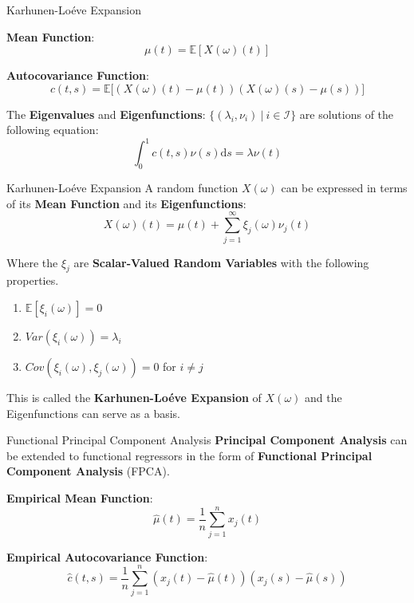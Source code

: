 \documentclass{beamer}
\begin{document}
	\begin{frame}{Karhunen-Lo\'{e}ve Expansion}
		
		\textbf{Mean Function}: $$\mu(t) = \mathbb{E}\left[ X(\omega)(t) \right]$$

		\textbf{Autocovariance Function}: $$c(t,s) = \mathbb{E}\big[ \left( X(\omega)(t) - \mu(t) \right) \left( X(\omega)(s) - \mu(s) \right) \big]$$
		
		The \textbf{Eigenvalues} and \textbf{Eigenfunctions}: $\{(\lambda_i, \nu_i) \: \vert \: i \in \mathcal{I}\}$  are solutions of the following equation:
		$$ \int_{0}^{1}c(t,s)\nu(s) \mathrm{d}s = \lambda \nu(t) $$
	\end{frame}
	
	\begin{frame}{Karhunen-Lo\'{e}ve Expansion}\label{KLE}
		A random function $X(\omega)$ can be expressed in terms of its \textbf{Mean Function} and its \textbf{Eigenfunctions}:
		$$X(\omega)(t) = \mu(t) + \sum_{j = 1}^{\infty} \xi_j(\omega) \nu_j(t)$$
		
		Where the $\xi_j$ are \textbf{Scalar-Valued Random Variables} with the following properties.
		\begin{multicols}{2}
			\begin{enumerate}
				\item $\mathbb{E}[\xi_i(\omega)] = 0$
				\item $Var(\xi_i(\omega)) = \lambda_i$
				\item $Cov(\xi_i(\omega), \xi_j(\omega)) = 0$ for $i \neq j$
			\end{enumerate}
		\end{multicols}
		
		This is called the \textbf{Karhunen-Lo\'{e}ve Expansion} of $X(\omega)$ and the Eigenfunctions can serve as a basis. \\
		
		\hyperlink{spectral}{}
	\end{frame}

	\begin{frame}{Functional Principal Component Analysis}
		\textbf{Principal Component Analysis} can be extended to functional regressors in the form of \textbf{Functional Principal Component Analysis} (FPCA).
		\vspace{0.4cm}
		
		\textbf{Empirical Mean Function}:
		$$\hat{\mu}(t) = \frac{1}{n}\sum_{j = 1}^{n}x_j(t)$$

		\textbf{Empirical Autocovariance Function}:
		$$\hat{c}(t,s) = \frac{1}{n} \sum_{j = 1}^{n} \left(x_j(t) - \hat{\mu}(t)\right) \left(x_j(s) - \hat{\mu}(s)\right)$$

	\end{frame}
\end{document}
